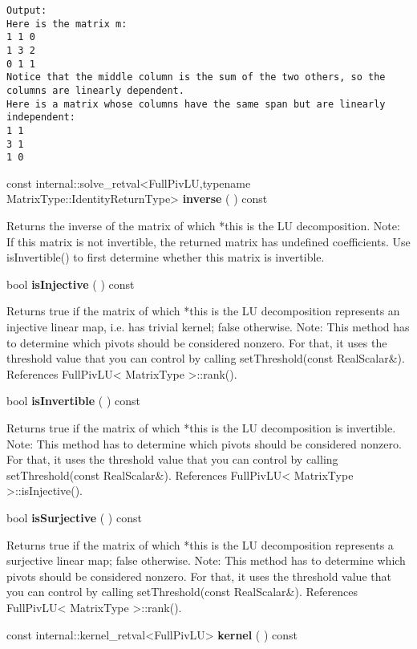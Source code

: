\begin{verbatim}
Output:
Here is the matrix m:
1 1 0
1 3 2
0 1 1
Notice that the middle column is the sum of the two others, so the columns are linearly dependent.
Here is a matrix whose columns have the same span but are linearly independent:
1 1
3 1
1 0
\end{verbatim}


\vspace{0.3cm}
const internal::solve\_retval<FullPivLU,typename MatrixType::IdentityReturnType> \textbf{inverse}  ( )  const 

Returns the inverse of the matrix of which *this is the LU decomposition.
Note: If this matrix is not invertible, the returned matrix has undefined coefficients. Use isInvertible() to first determine whether this matrix is invertible.


\vspace{0.3cm}
bool \textbf{isInjective}  ( )  const 

Returns true if the matrix of which *this is the LU decomposition represents an injective linear map, i.e. has trivial kernel; false otherwise.
Note: This method has to determine which pivots should be considered nonzero. For that, it uses the threshold value that you can control by calling setThreshold(const RealScalar\&). References FullPivLU< MatrixType >::rank().


\vspace{0.3cm}
bool \textbf{isInvertible}  ( )  const 

Returns true if the matrix of which *this is the LU decomposition is invertible.
Note: This method has to determine which pivots should be considered nonzero. For that, it uses the threshold value that you can control by calling setThreshold(const RealScalar\&). References FullPivLU< MatrixType >::isInjective().


\vspace{0.3cm}
bool \textbf{isSurjective}  ( )  const 

Returns true if the matrix of which *this is the LU decomposition represents a surjective linear map; false otherwise.
Note: This method has to determine which pivots should be considered nonzero. For that, it uses the threshold value that you can control by calling setThreshold(const RealScalar\&). References FullPivLU< MatrixType >::rank().


\vspace{0.3cm}
const internal::kernel\_retval<FullPivLU> \textbf{kernel}  ( )  const 

